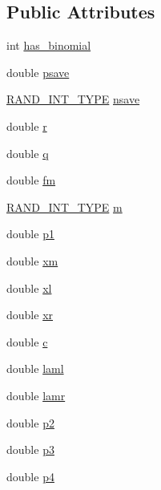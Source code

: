 \subsection*{Public Attributes}
\begin{DoxyCompactItemize}
\item 
int \hyperlink{structs__binomial__t_acc4ed1e192697a3c1af55dd220ff5075}{has\+\_\+binomial}
\item 
double \hyperlink{structs__binomial__t_a5b1f2c8074174da67f37b6cf5f25cfb5}{psave}
\item 
\hyperlink{distributions_8h_abfa1397c653784f9b040ba5bcb0448a2}{R\+A\+N\+D\+\_\+\+I\+N\+T\+\_\+\+T\+Y\+PE} \hyperlink{structs__binomial__t_ad612b6c73e041619663755718caffe0a}{nsave}
\item 
double \hyperlink{structs__binomial__t_a56efaaffc56c06b02f19339db2ef3cd8}{r}
\item 
double \hyperlink{structs__binomial__t_af16e9bb2043cc62b28e35607cc89eab0}{q}
\item 
double \hyperlink{structs__binomial__t_acc645f57b50188a99c9c969a1a3a1761}{fm}
\item 
\hyperlink{distributions_8h_abfa1397c653784f9b040ba5bcb0448a2}{R\+A\+N\+D\+\_\+\+I\+N\+T\+\_\+\+T\+Y\+PE} \hyperlink{structs__binomial__t_a6a12cbd2767cacc07a0a25d9b2c6a7d6}{m}
\item 
double \hyperlink{structs__binomial__t_ab7286bb608f8169950b54b2b48046742}{p1}
\item 
double \hyperlink{structs__binomial__t_ab136362574228316fc915f4ffd747cda}{xm}
\item 
double \hyperlink{structs__binomial__t_aa46efb684fd21a1b8a8d7a5268b65371}{xl}
\item 
double \hyperlink{structs__binomial__t_af6cd0e49cf8b3b345557099657953c03}{xr}
\item 
double \hyperlink{structs__binomial__t_a8af46f7444803e94db890eaea3d4a09b}{c}
\item 
double \hyperlink{structs__binomial__t_a7142c279779d180ec646d0cfe65b10b7}{laml}
\item 
double \hyperlink{structs__binomial__t_a7997d8558e162f89a135b1f65d9bb207}{lamr}
\item 
double \hyperlink{structs__binomial__t_ae915d87bff728fec24730a8f801c6a5c}{p2}
\item 
double \hyperlink{structs__binomial__t_a9bba690c15a623de0cd922724c554abd}{p3}
\item 
double \hyperlink{structs__binomial__t_ac053b18f68feddec4049857410dffbe2}{p4}
\end{DoxyCompactItemize}


